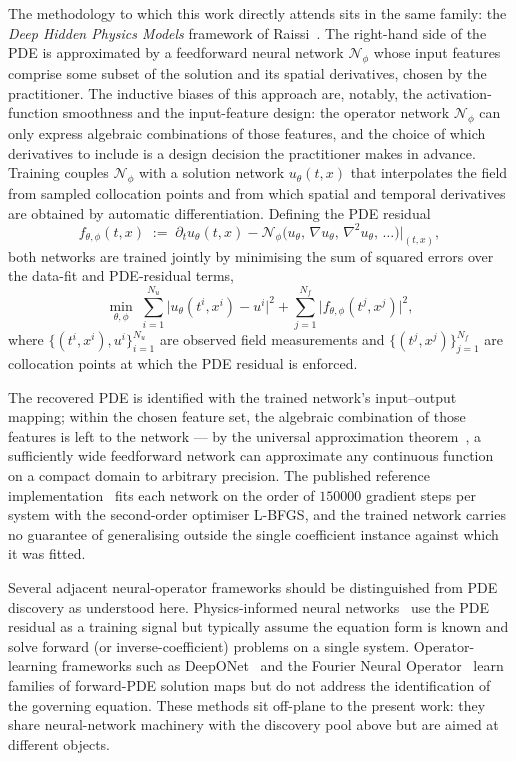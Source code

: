 \documentclass[10pt,journal,compsoc]{IEEEtran}
\begin{document}
The methodology to which this work directly attends sits in the same family:
the \emph{Deep Hidden Physics Models} framework of Raissi~\cite{raissi2018}.
The right-hand side of the PDE is approximated by a feedforward neural
network $\mathcal{N}_\phi$ whose input features comprise some subset of the
solution and its spatial derivatives, chosen by the practitioner. The
inductive biases of this approach are, notably, the activation-function
smoothness and the input-feature design: the operator network $\mathcal{N}_\phi$
can only express algebraic combinations of those features, and the choice of
which derivatives to include is a design decision the practitioner makes in
advance. Training couples $\mathcal{N}_\phi$ with a solution network
$u_\theta(t, x)$ that interpolates the field from sampled collocation points
and from which spatial and temporal derivatives are obtained by automatic
differentiation. Defining the PDE residual
%
\begin{equation}\label{eq:dhpm_residual}
f_{\theta, \phi}(t, x) \;:=\;
\partial_t u_\theta(t, x) - \mathcal{N}_\phi\bigl(u_\theta,\, \nabla u_\theta,\, \nabla^2 u_\theta,\, \ldots\bigr)\big|_{(t, x)},
\end{equation}
%
both networks are trained jointly by minimising the sum of squared errors over
the data-fit and PDE-residual terms,
%
\begin{equation}\label{eq:dhpm_loss}
\min_{\theta, \phi}\;
\sum_{i=1}^{N_u}\bigl|u_\theta(t^i, x^i) - u^i\bigr|^2
+ \sum_{j=1}^{N_f}\bigl|f_{\theta, \phi}(t^j, x^j)\bigr|^2,
\end{equation}
%
where $\{(t^i, x^i), u^i\}_{i=1}^{N_u}$ are observed field measurements and
$\{(t^j, x^j)\}_{j=1}^{N_f}$ are collocation points at which the PDE residual
is enforced.

The recovered PDE is identified with the trained network's input--output
mapping; within the chosen feature set, the algebraic combination of those
features is left to the network --- by the universal approximation
theorem~\cite{cybenko1989, hornik1991}, a sufficiently wide
feedforward network can approximate any continuous function on a compact
domain to arbitrary precision. The published reference
implementation~\cite{raissi_code} fits each network on the order of
$150000$ gradient steps per system with the second-order optimiser L-BFGS, and
the trained network carries no guarantee of generalising outside the single
coefficient instance against which it was fitted.

Several adjacent neural-operator frameworks should be
distinguished from PDE discovery as understood here.
Physics-informed neural networks~\cite{raissi2019pinn} use
the PDE residual as a training signal but typically assume the
equation form is known and solve forward (or
inverse-coefficient) problems on a single system. Operator-learning
frameworks such as DeepONet~\cite{lu2021deeponet} and the
Fourier Neural Operator~\cite{li2021fno} learn families of
forward-PDE solution maps but do not address the identification
of the governing equation. These methods sit off-plane to the
present work: they share neural-network machinery with the
discovery pool above but are aimed at different objects.
\end{document}
